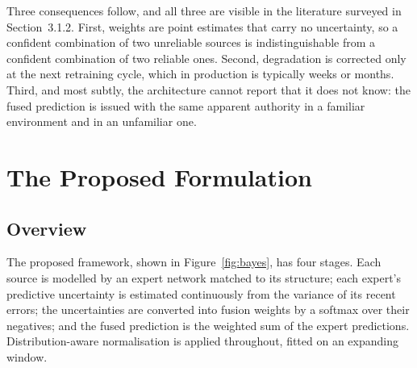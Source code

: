 Three consequences follow, and all three are visible in the literature surveyed in
Section~3.1.2. First, weights are point estimates that carry no uncertainty, so a confident
combination of two unreliable sources is indistinguishable from a confident combination of two
reliable ones. Second, degradation is corrected only at the next retraining cycle, which in
production is typically weeks or months. Third, and most subtly, the architecture cannot report
that it does not know: the fused prediction is issued with the same apparent authority in a
familiar environment and in an unfamiliar one.

\section{The Proposed Formulation}
\label{sec:dyn-formulation}

\subsection{Overview}

The proposed framework, shown in Figure~\ref{fig:bayes}, has four stages. Each source is modelled
by an expert network matched to its structure; each expert's predictive uncertainty is estimated
continuously from the variance of its recent errors; the uncertainties are converted into fusion
weights by a softmax over their negatives; and the fused prediction is the weighted sum of the
expert predictions. Distribution-aware normalisation is applied throughout, fitted on an
expanding window.

